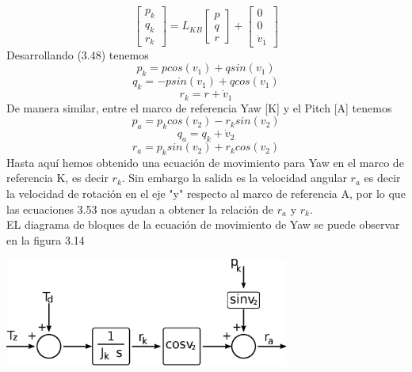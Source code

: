 \begin{equation}
	\begin{bmatrix}
		p_k\\
		q_k\\
		r_k
	\end{bmatrix}
	=L_{KB}
	\begin{bmatrix}
		p\\
		q\\
		r
	\end{bmatrix}
	+
	\begin{bmatrix}
		0\\
		0\\
		\dot{v}_1
	\end{bmatrix}
\end{equation}
Desarrollando (3.48) tenemos
\begin{equation}\nonumber
	p_k=pcos(v_1) + qsin(v_1)
\end{equation}
\begin{equation}
	q_k = -psin(v_1) + qcos(v_1)
\end{equation}
\begin{equation}\nonumber
	r_k= r + \dot{v}_1
\end{equation}
De manera similar, entre el marco de referencia Yaw [K] y el Pitch [A] tenemos
\begin{equation}\nonumber
	p_a = p_kcos(v_2) - r_ksin(v_2)
\end{equation}
\begin{equation}
	q_a = q_k + \dot{v}_2
\end{equation}
\begin{equation}\nonumber
	r_a = p_ksin(v_2) + r_kcos(v_2)
\end{equation}
Hasta aquí hemos obtenido una ecuación de movimiento para Yaw en el marco de referencia K, es decir $r_k$. Sin embargo la salida es la velocidad angular $r_a$ es decir
la velocidad de rotación en el eje "y" respecto al marco de referencia A, por lo que las ecuaciones 3.53 nos ayudan a obtener la relación de $r_a$ y $r_k$.\\
EL diagrama de bloques de la ecuación de movimiento de Yaw se puede observar en la figura 3.14
\begin{center}
	\includegraphics[width=0.7\textwidth]{Contenido/Cuerpo/Capitulo3/Fig22.eps}
	\label{fig:ModeloMat:Fig1}
\end{center}


